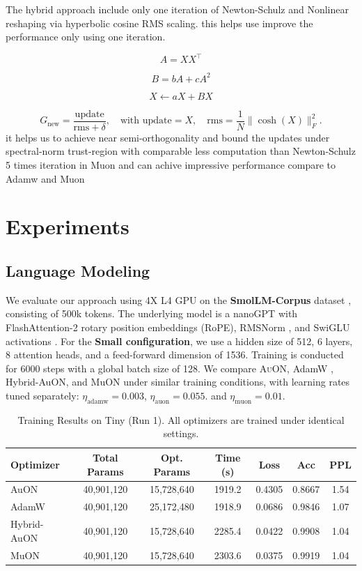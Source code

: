 \documentclass[12pt,a4paper]{article}
\begin{document}
The hybrid approach include only one iteration of Newton-Schulz and Nonlinear reshaping via hyperbolic cosine RMS scaling. this helps use improve the performance only using one iteration.


\[
A = X X^\top
\]

\[
B = bA + cA^2
\]

\[
X \leftarrow aX + BX
\]

\[
G_{\text{new}} = \frac{\text{update}}{\mathrm{rms} + \delta},
\quad 
\text{with } \text{update} = X,
\quad 
\mathrm{rms} = \frac{1}{N} \| \cosh(X) \|_F^2.
\]
it helps us to achieve  near semi-orthogonality   and bound the updates under  spectral-norm trust-region with comparable less computation than Newton-Schulz 5 times iteration in Muon and can achive impressive  performance compare to Adamw and Muon

\section{Experiments}
\subsection{Language Modeling}
We evaluate our approach using  4X L4 GPU   on  the \textbf{SmolLM-Corpus} dataset\parencite{benallal2024smollmcorpus} , consisting of 500k tokens. 
The underlying model is a nanoGPT\parencite{Karpathy2022} with FlashAttention-2\parencite{dao2023flashattention2fasterattentionbetter} rotary position embeddings (RoPE)\parencite{su2023roformerenhancedtransformerrotary}, RMSNorm \parencite{huang2019rmsnorm}, and SwiGLU activations \parencite{shazeer2020gluvariantsimprovetransformer}. 
For the \textbf{Small configuration}, we use a hidden size of 512, 6 layers, 8 attention heads, and a feed-forward dimension of 1536. 
Training is conducted for 6000 steps with a global batch size of 128. 
We compare \textsc{AuON}, AdamW \parencite{loshchilov2019decoupledweightdecayregularization}, Hybrid-AuON, and MuON under similar training conditions, with learning rates tuned separately: 
$\eta_{\text{adamw}} = 0.003$, $\eta_{\text{auon}} = 0.055$. and $\eta_{\text{muon}} = 0.01$. \parencite{rosic2025muon}

\begin{table}[h] 
\centering
\caption{Training Results on Tiny (Run 1). All optimizers are trained under identical settings.}
\label{tab:tiny_run1}
\begin{tabular}{lcccccc}
\hline
\textbf{Optimizer} & \textbf{Total Params} & \textbf{Opt. Params} & \textbf{Time (s)} & \textbf{Loss} & \textbf{Acc} & \textbf{PPL} \\
\hline
AuON         & 40,901,120 & 15,728,640 & 1919.2 & 0.4305 & 0.8667 & 1.54 \\
AdamW        & 40,901,120 & 25,172,480 & 1918.9 & 0.0686 & 0.9846 & 1.07 \\
Hybrid-AuON  & 40,901,120 & 15,728,640 & 2285.4 & 0.0422 & 0.9908 & 1.04 \\
MuON         & 40,901,120 & 15,728,640 & 2303.6 & 0.0375 & 0.9919 & 1.04 \\
\hline
\end{tabular}
\end{table}
\end{document}
